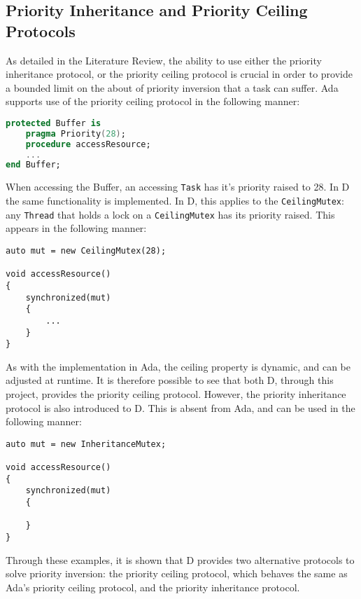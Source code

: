\subsection{Priority Inheritance and Priority Ceiling Protocols}
As detailed in the Literature Review, the ability to use either the priority
inheritance protocol, or the priority ceiling protocol is crucial in order to
provide a bounded limit on the about of priority inversion that a task can
suffer. Ada supports use of the priority ceiling protocol in the following
manner: 
\begin{lstlisting}[basicstyle=\small,language=Ada]
protected Buffer is 
    pragma Priority(28); 
    procedure accessResource; 
    ...
end Buffer; 
\end{lstlisting}
When accessing the Buffer, an accessing \texttt{Task} has it's priority raised
to 28. In D the same functionality is implemented. In D, this applies to
the \texttt{CeilingMutex}: any \texttt{Thread} that holds a lock on a
\texttt{CeilingMutex} has its priority raised. This appears in the following
manner: 
\begin{lstlisting}[basicstyle=\small]
auto mut = new CeilingMutex(28); 

void accessResource()
{
    synchronized(mut)
    {
        ...
    }
}
\end{lstlisting}
As with the implementation in Ada, the ceiling property is dynamic, and can be
adjusted at runtime. It is therefore possible to see that both D, through this
project, provides the priority ceiling protocol. However, the priority
inheritance protocol is also introduced to D. This is absent from Ada, and can
be used in the following manner: 
\begin{lstlisting}[basicstyle=\small]
auto mut = new InheritanceMutex; 

void accessResource()
{
    synchronized(mut)
    {

    }
}
\end{lstlisting}
Through these examples, it is shown that D provides two alternative protocols
to solve priority inversion: the priority ceiling protocol, which behaves the
same as Ada's priority ceiling protocol, and the priority inheritance protocol. 

